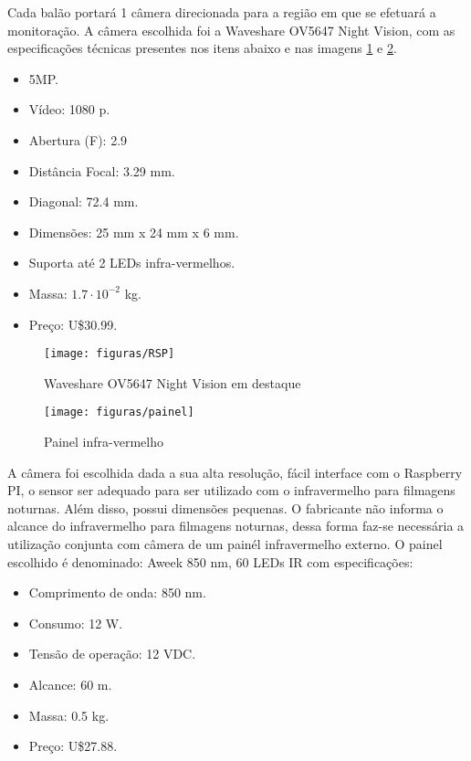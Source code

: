 Cada balão portará 1 câmera direcionada para a região em que se efetuará a monitoração. A câmera escolhida foi a Waveshare OV5647 Night Vision, com as especificações técnicas presentes nos itens abaixo e nas imagens \ref{img:Waveshare} e \ref{img:painel}.

\begin{itemize}
	\item 5MP.
	\item Vídeo: 1080 p.
	\item Abertura (F): 2.9
	\item Distância Focal: 3.29 mm.
	\item Diagonal: 72.4 mm.
	\item Dimensões: 25 mm x 24 mm x 6 mm.
	\item Suporta até 2 LEDs infra-vermelhos.
	\item Massa: $1.7 \cdot 10^{-2}$ kg.
	\item Preço: U\$30.99.
\end{itemize}

\begin{figure}[H]
  \centering
  \caption[Waveshare OV5647 Night Vision em destaque]{Waveshare OV5647 Night Vision em destaque~\cite{amazon1}}
  \label{img:Waveshare}
  \texttt{[image: figuras/RSP]}
\end{figure}

\begin{figure}[H]
  \centering
  \caption[Painel infra-vermelho]{Painel infra-vermelho~\cite{amazon2}}
  \label{img:painel}
  \texttt{[image: figuras/painel]}
\end{figure}

A câmera foi escolhida dada a sua alta resolução, fácil interface com o Raspberry PI, o sensor ser adequado para ser utilizado com o infravermelho para filmagens noturnas. Além disso, possui dimensões pequenas. O fabricante não informa o alcance do infravermelho para filmagens noturnas, dessa forma faz-se necessária a utilização conjunta com  câmera de um painél infravermelho externo. O painel escolhido é denominado: Aweek 850 nm, 60 LEDs IR com especificações:

\begin{itemize}
	\item Comprimento de onda: 850 nm.
	\item Consumo: 12 W.
	\item Tensão de operação: 12 VDC.
	\item Alcance: 60 m.
	\item Massa: 0.5 kg.
	\item Preço: U\$27.88.
\end{itemize}

